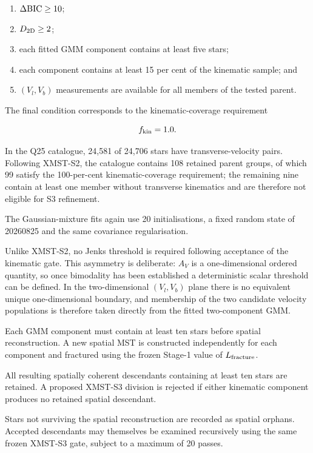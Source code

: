 \documentclass[fleqn,usenatbib]{rasti}
\begin{document}
\begin{enumerate}
    \item $\Delta{\rm BIC}\geq10$;
    \item $D_{\rm 2D}\geq2$;
    \item each fitted GMM component contains at least five stars;
    \item each component contains at least 15 per cent of the 
          kinematic sample; and
    \item  $(V_l,V_b)$ measurements are available for all members
          of the tested parent.
\end{enumerate}

The final condition corresponds to the kinematic-coverage requirement

\[
f_{\rm kin}=1.0.
\]

In the Q25 catalogue, 24,581 of 24,706 stars have transverse-velocity pairs. Following XMST-S2, the catalogue contains 108 retained parent groups, of which 99 satisfy the 100-per-cent kinematic-coverage requirement; the remaining nine contain at least one member without transverse kinematics and are therefore not eligible for S3 refinement.


The Gaussian-mixture fits again use 20 initialisations, a fixed
random state of 20260825 and the same covariance regularisation.

Unlike XMST-S2, no Jenks threshold is required following acceptance
of the kinematic gate. This asymmetry is deliberate: $A_V$ is a
one-dimensional ordered quantity, so once bimodality has been established
a deterministic scalar threshold can be defined. In the two-dimensional
$(V_l,V_b)$ plane there is no equivalent unique one-dimensional boundary,
and membership of the two candidate velocity populations is therefore
taken directly from the fitted two-component GMM.

Each GMM component must contain at least ten stars before spatial
reconstruction. A new spatial MST is constructed independently for each
component and fractured using the frozen Stage-1 value of
$L_{\rm fracture}$.

All resulting spatially coherent descendants containing at least ten stars
are retained. A proposed XMST-S3 division is rejected if either kinematic
component produces no retained spatial descendant.

Stars not surviving the spatial reconstruction are recorded as spatial
orphans. Accepted descendants may themselves be examined recursively using
the same frozen XMST-S3 gate, subject to a maximum of 20 passes.
\end{document}
